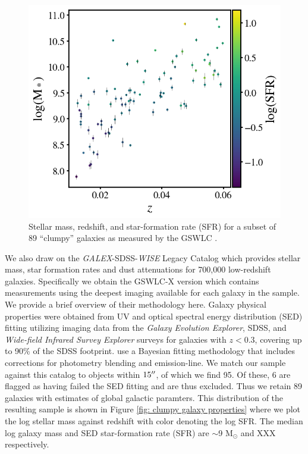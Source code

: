 \begin{figure}
\includegraphics[width=\textwidth]{Figures/mass_z_sfr.png}
\caption[Stellar mass, redshift, and Star-formation rate for a subset of our ``clumpy'' galaxies as measured by the GSWLC.]{Stellar mass, redshift, and star-formation rate (SFR) for a subset of 89 ``clumpy'' galaxies as measured by the GSWLC \citep{Salim2016}.}
\end{figure}

We also draw on the \textit{GALEX}-SDSS-\textit{WISE} Legacy Catalog \citep[GSWLC,][]{Salim2016} which provides stellar mass, star formation rates and dust attenuations for 700,000 low-redshift galaxies. Specifically we obtain the GSWLC-X version which contains measurements using the deepest imaging available for each galaxy in the sample. We provide a brief overview of their methodology here.  Galaxy physical properties were obtained from UV and optical spectral energy distribution (SED) fitting utilizing imaging data from the \textit{Galaxy Evolution Explorer}, SDSS, and \textit{Wide-field Infrared Survey Explorer} surveys for galaxies with $z<0.3$, covering up to 90\% of the SDSS footprint. \cite{Salim2016} use a Bayesian fitting methodology that includes corrections for photometry blending and emission-line.  We match our sample against this catalog to objects within $15\mbox{$^{\prime\prime}$}$, of which we find 95. Of these, 6 are flagged as having failed the SED fitting and are thus excluded. Thus we retain 89 galaxies with estimates of global galactic paramters. This distribution of the resulting sample is shown in Figure \ref{fig: clumpy galaxy properties} where we plot the log stellar mass against redshift with color denoting the log SFR. The median log galaxy mass and SED star-formation rate (SFR) are $\sim$9 M$_{\odot}$ and XXX respectively. 


